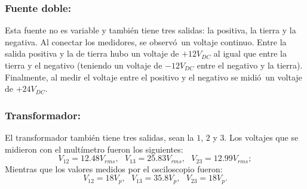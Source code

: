 \documentclass{article}
\begin{document}
\subsubsection*{Fuente doble:}
Esta fuente no es variable y tambi\'en tiene tres salidas: la positiva, la tierra y la negativa. Al conectar los medidores, se observ\'o\ un voltaje continuo. Entre la salida positiva y la de tierra hubo un voltaje de $+12V_{DC}$ al igual que entre la tierra y el negativo (teniendo un voltaje de $-12V_{DC}$ entre el negativo y la tierra). Finalmente, al medir el voltaje entre el positivo y el negativo se midi\'o\ un voltaje de $+24V_{DC}$.

\subsubsection*{Transformador:}
El transformador tambi\'en tiene tres salidas, sean la $1$, $2$ y $3$. Los voltajes que se midieron con el mult\'imetro fueron los siguientes:
$$V_{12}=12.48V_{rms}, \ \ \ V_{13}=25.83V_{rms}, \ \ \ V_{23}=12.99V_{rms};$$
Mientras que los valores medidos por el osciloscopio fueron:
$$V_{12}=18V_p, \ \ \ V_{13}=35.8V_p, \ \ \ V_{23}=18V_p.$$
\end{document}
